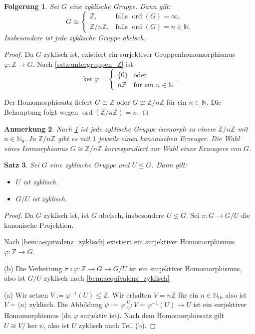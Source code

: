 \documentclass[a4paper, twoside, 11pt, ngerman]{report}
\newcommand{\NN}{\mathds N}
\newcommand{\ZZ}{\mathds Z}
\DeclareMathOperator{\ord}{ord}
\theoremstyle{definistyle}
\newtheorem{satz}{Satz}[section]
\newtheorem{anm}[satz]{Anmerkung}
\newtheorem{folgerung}[satz]{Folgerung}
\theoremstyle{remark}
\begin{document}
\begin{folgerung}\label{folg:ordnung_zyklische_gruppe}
Sei $G$ eine zyklische Gruppe. Dann gilt:
\[
G \cong \begin{cases}
\ZZ, & \text{falls $\ord(G) = \infty$,} \\
\ZZ / n \ZZ, & \text{falls $\ord(G) = n \in \NN$}.
\end{cases}
\]
Insbesondere ist jede zyklische Gruppe abelsch.
\end{folgerung}

\begin{proof}
Da $G$ zyklisch ist, existiert ein surjektiver Gruppenhomomorphismus $\varphi \colon \ZZ \to G$. Nach \ref{satz:untergruppen_Z} ist \[\ker \varphi = \begin{cases} \{0\} & \text{oder} \\ n \ZZ & \text{für ein } n\in\NN\end{cases}.\]

Der Homomorphiesatz liefert $G \cong \ZZ$ oder $G \cong \ZZ / n \ZZ$ für ein $n \in \NN$. Die Behauptung folgt wegen $\ord(\ZZ / n \ZZ) = n$.
\end{proof}

\begin{anm}\label{anm:ordnung_zyklische_gruppen}
Nach \ref{folg:ordnung_zyklische_gruppe} ist jede zyklische Gruppe isomorph zu einem $\ZZ / n \ZZ$ mit $n \in \NN_0$. In $\ZZ / n \ZZ$ gibt es mit $\overline{1}$ jeweils einen kanonischen Erzeuger. Die Wahl eines Isomorphismus $G \cong \ZZ / n \ZZ$ korrespondiert zur Wahl eines Erzeugers von $G$.
\end{anm}

\begin{satz}\label{satz:zykl_gruppen_quot}
Sei $G$ eine zyklische Gruppe und $U \leq G$. Dann gilt:
\begin{itemize}
    \item[(a)] $U$ ist zyklisch.
    \item[(b)] $G/U$ ist zyklisch.
\end{itemize}
\end{satz}

\begin{proof}
Da $G$ zyklisch ist, ist $G$ abelsch, insbesondere $U \trianglelefteq G$. Sei $\pi \colon G \to G/U$ die kanonische Projektion.

Nach \ref{bem:aequivalenz_zyklisch} existiert ein surjektiver Homomorphismus $\varphi \colon \ZZ \to G$.

(b) Die Verkettung $\pi \circ \varphi \colon \ZZ \to G \to G/U$ ist ein surjektiver Homomorphismus, also ist $G/U$ zyklisch nach \ref{bem:aequivalenz_zyklisch}

(a) Wir setzen $V := \varphi^{-1}(U) \leq \ZZ$. Wir erhalten $V = n\ZZ$ für ein $n \in \NN_0$, also ist $V = \langle n \rangle$ zyklisch. Die Abbildung $\psi:=\varphi|_V^U \colon V = \varphi^{-1}(U) \to U$ ist ein surjektiver Homomorphismus (da $\varphi$ surjektiv ist). Nach dem Homomorphiesatz gilt $U \cong V / \ker \psi$, also ist $U$ zyklisch nach Teil (b).
\end{proof}
\end{document}
